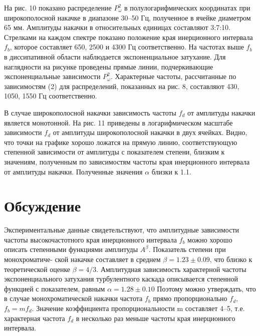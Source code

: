 На рис. 10 показано распределение $P^2_\omega$ в полулогарифмических координатах при широкополосной накачке в диапазоне 30–50 Гц, полученное в ячейке диаметром 65 мм. Амплитуды накачки в относительных единицах составляют 3:7:10. Стрелками на каждом спектре показано положение края инерционного интервала $f_b$, которое составляет 650, 2500 и 4300 Гц соответственно. На частотах выше $f_b$ в диссипативной области наблюдается экспоненциальное затухание. Для наглядности на рисунке проведены прямые линии, подчеркивающие экспоненциальные зависимости $P^2_\omega$. Характерные частоты, рассчитанные по зависимостям (2) для распределений, показанных на рис. 8, составляют 430, 1050, 1550 Гц соответственно.

В случае широкополосной накачки зависимость частоты $f_d$ от амплитуды накачки является монотонной. На рис. 11 приведены в логарифмическом масштабе зависимости $f_d$ от амплитуды широкополосной накачки в двух ячейках. Видно, что точки на графике хорошо ложатся на прямую линию, соответствующую степенной зависимости от амплитуды с показателем степени, близким к значениям, полученным по зависимостям частоты края инерционного интервала от амплитуды накачки. Полученные значения $\alpha$ близки к 1.1.

\section{Обсуждение} \label{sect2_3}

Экспериментальные данные свидетельствуют, что амплитудные зависимости частоты высокочастотного края инерционного интервала $f_b$ можно хорошо описать степенными функциями амплитуды $A^\beta$. Показатель степени при монохроматиче- ской накачке составляет в среднем $\beta = 1.23 \pm 0.09$, что близко к теоретической оценке $\beta = 4/3$. Амплитудная зависимость характерной частоты экспоненциального затухания турбулентного каскада описывается степенной функцией с показателем, равным $\alpha = 1.28 \pm 0.10$ Поэтому можно утверждать, что в случае монохроматической накачки частота $f_b$ прямо пропорционально $f_d$, $f_b = m f_d$. Значение коэффициента пропорциональности m составляет 4–5, т.е. характерная частота $f_d$ в несколько раз меньше частоты края инерционного интервала.

